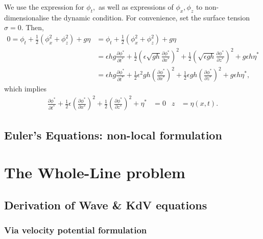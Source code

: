 \documentclass[10pt,reqno,oneside,a4paper]{article}
\begin{document}
We use the expression for $\phi_t,$ as well as expressions of $\phi_x, \phi_z$ to non-dimensionalise the dynamic condition. For convenience, set the surface tension $\sigma =0.$ Then,
\begin{align*}
0 = \phi_t + \frac{1}{2} (\phi_x^2 + \phi_z^2) + g\eta &=  \phi_t + \frac{1}{2} (\phi_x^2 + \phi_z^2) + g\eta \\
&= \epsilon h g \frac{\partial \phi^*}{\partial t^*} + \frac{1}{2} \left( \epsilon\sqrt{g h} \frac{\partial \phi^*}{\partial x^*}\right)^2 +  \frac{1}{2}\left(\sqrt{\epsilon g h} \frac{\partial \phi^*}{\partial z^*}\right)^2 + g \epsilon h \eta^* \\
&= \epsilon h g \frac{\partial \phi^*}{\partial t^*} + \frac{1}{2}  \epsilon^2 g h \left(\frac{\partial \phi^*}{\partial x^*}\right)^2 +  \frac{1}{2} \epsilon g h \left(\frac{\partial \phi^*}{\partial z^*}\right)^2 + g \epsilon h \eta^*,
\end{align*}
which implies 
\begin{align*}
\frac{\partial \phi^*}{\partial t^*} + \frac{1}{2}  \epsilon \left(\frac{\partial \phi^*}{\partial x^*}\right)^2 +  \frac{1}{2} \left(\frac{\partial \phi^*}{\partial z^*}\right)^2 + \eta^*  &= 0 &z &= \eta(x, t).
\end{align*}

\subsection{Euler's Equations: non-local formulation}

\section{The Whole-Line problem}

\subsection{Derivation of Wave \& KdV equations}

\subsubsection{Via velocity potential formulation}
\end{document}
